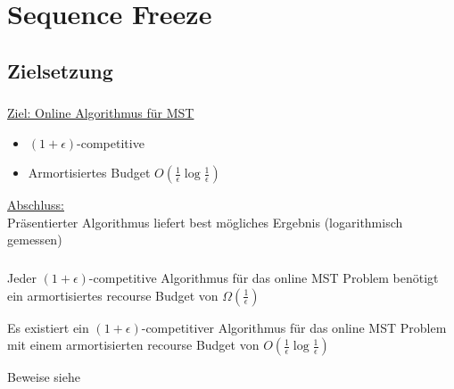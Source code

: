 \section{Sequence Freeze}

\subsection{Zielsetzung}
\begin{frame}
    \frametitle{\insertsection}
    \underline{Ziel: Online Algorithmus für MST}
    \vspace{1em}
    \begin{itemize}
        \itemsep\setlength{.8em}
        \item $(1+\epsilon)$-competitive
        \item Armortisiertes Budget $O(\frac{1}{\epsilon}\log\frac{1}{\epsilon})$
    \end{itemize}
    \vspace{1em}

    \underline{Abschluss:}\\
    \vspace{1em}
    Präsentierter Algorithmus liefert best mögliches Ergebnis (logarithmisch gemessen)
\end{frame}

\begin{frame}
    \frametitle{\insertsection}
    \begin{theorem}
        \vspace{1em}
        Jeder $(1+\epsilon)$-competitive Algorithmus für das online MST Problem benötigt ein armortisiertes recourse Budget von $\Omega(\frac{1}{\epsilon})$
        \vspace{1em}
    \end{theorem}
    \vspace{1em}
    \begin{theorem}
        \vspace{1em}
        Es existiert ein $(1+\epsilon)$-competitiver Algorithmus für das online MST Problem mit einem armortisierten recourse Budget von $O(\frac{1}{\epsilon}\log\frac{1}{\epsilon})$
        \vspace{1em}
    \end{theorem}
    Beweise siehe \cite{recourse2016}
\end{frame}

